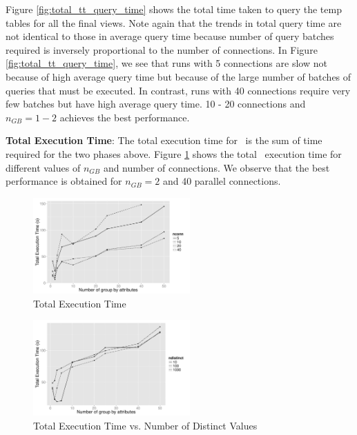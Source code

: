 Figure \ref{fig:total_tt_query_time} shows the total time taken to query the
temp tables for all the final views. Note again that the trends in total query
time are not identical to those in average query time because number of query
batches required is inversely proportional to the number of connections.
In Figure \ref{fig:total_tt_query_time}, we see that runs with 5 connections are
slow not because of high average query time but because of the large number of
batches of queries that must be executed. In contrast, runs with 40 connections
require very few batches but have high average query time. 10 - 20 connections
and $n_{GB}=1-2$ achieves the best performance.



{\bf Total Execution Time}: The total execution time for \SeeDB\ is the sum of
time required for the two phases above. Figure \ref{fig:total_time} shows the
total \SeeDB\ execution time for different values of $n_{GB}$ and number of
connections. We observe that the best performance is obtained for
$n_{GB}=2$ and 40 parallel connections.

\begin{figure}[h]
     \centering
    \includegraphics[width=6cm]{Images/mult_gb_total.pdf}
    \caption{Total Execution Time}
  \label{fig:total_time}
\end{figure}

\begin{figure}[h]
  \centering
    \includegraphics[width=6cm]{Images/mult_gb_diff_distinct.pdf}
    \caption{Total Execution Time vs. Number of Distinct Values} 
  \label{fig:total_time_diff_distinct}

\end{figure}

